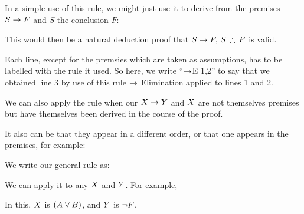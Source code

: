 In a simple use of this rule, we might just use it to derive from the premises $S\rightarrow F$ and $S$ the conclusion $F$:
\begin{pf}
	 
\end{pf}
This would then be a natural deduction proof that
$S\eif F,\, S\,\therefore \, F$ is valid.

Each line, except for the premsies which are taken as assumptions, has to be labelled with the rule it used. So here, we write ``$\rightarrow$E 1,2'' to say that we obtained line 3 by use of this rule $\rightarrow$ Elimination applied to lines 1 and 2.

We can also apply the rule when our $X\rightarrow Y$ and $X$ are not themselves premises but have themselves been derived in the course of the proof.

\begin{pf}
	 
\end{pf}

It also can be that they appear in a different order, or that one appears in the premises, for example:
\begin{pf}
	\ellipsesline
	\ellipsesline
	 
\end{pf}

We write our general rule as:

We can apply it to any $X$ and $Y$.
For example,
\begin{pf}
	 
\end{pf}
In this, $X$ is $(A\vee B)$, and $Y$ is $\neg F$.



